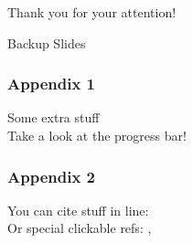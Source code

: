 \documentclass[mathserif, fleqn]{beamer}
\begin{document}
%         

%         

\begin{frame}[plain,c]
  \renewcommand*\item{\olditem[]}
  \begin{center}
    \textcolor{aiphired}{\LARGE Thank you for your attention!}
  \end{center}
\end{frame}

\appendix
\backupbegin

\begin{frame}[plain]
  \begin{center}
    {\Huge{}Backup Slides}
  \end{center}
\end{frame}

\begin{frame}\frametitle{Appendix 1}
  Some extra stuff\\[2ex]
  Take a look at the progress bar!
\end{frame}

\begin{frame}\frametitle{Appendix 2}
  You can cite stuff in line: \\
  Or special clickable refs: , 
\end{frame}

\backupend
\end{document}
